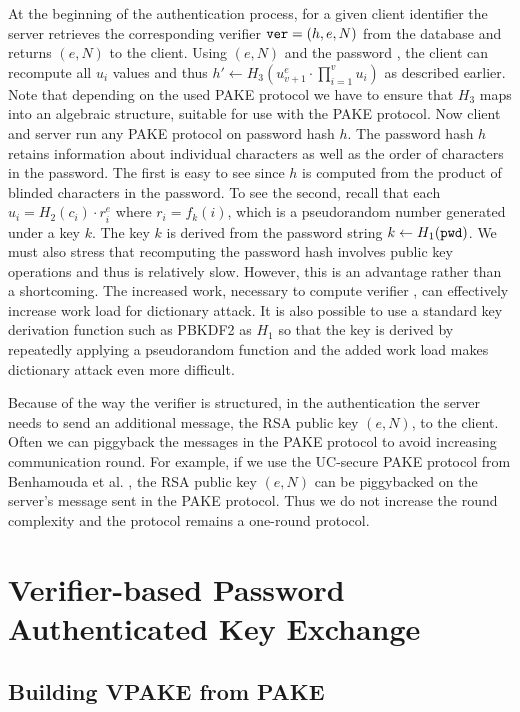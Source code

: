 At the beginning of the authentication process, for a given client identifier the server retrieves the corresponding verifier $\mathtt{ver}=(h, e, N)$ from the database and returns $(e,N)$ to the client.
Using $(e,N)$ and the password \pwd, the client can recompute all $u_i$ values and thus $h'\gets H_3(u_{v+1}^e\cdot\prod_{i=1}^{v}u_i)$ as described earlier.
Note that depending on the used PAKE protocol we have to ensure that $H_3$ maps into an algebraic structure, suitable for use with the PAKE protocol.
Now client and server run any PAKE protocol on password hash $h$. The password hash $h$ retains information about individual characters as well as the order of characters in the password. The first is easy to see since $h$ is computed from the product of blinded characters in the password.  
To see the second, recall that each $u_i=H_2(c_i)\cdot r_i^e$ where $r_i=f_k(i)$, which is a pseudorandom number generated under a key $k$. 
The key $k$ is derived from the password string $k\gets H_1(\mathtt{pwd})$. 
We must also stress that recomputing the password hash involves public key operations and thus is relatively slow.
However, this is an advantage rather than a shortcoming. 
The increased work, necessary to compute verifier \ver, can effectively increase work load for dictionary attack. It is also possible to use a standard key derivation function such as PBKDF2 \cite{rfc2898} as $H_1$ so that the key is derived by repeatedly applying a pseudorandom function and the added work load makes dictionary attack even more difficult.

Because of the way the verifier is structured, in the authentication the server needs to send an additional message, the RSA public key $(e,N)$, to the client. Often we can piggyback the messages in the PAKE protocol to avoid increasing communication round. For example, if we use the UC-secure PAKE protocol from Benhamouda et al. \cite{BenhamoudaBCPV13}, the RSA public key $(e,N)$ can be piggybacked on the server's message sent in the PAKE protocol. Thus we do not increase the round complexity and the protocol remains a one-round protocol.


\section{Verifier-based Password Authenticated Key Exchange} \label{sec:vpake-pake}

\subsection{Building VPAKE from PAKE}

